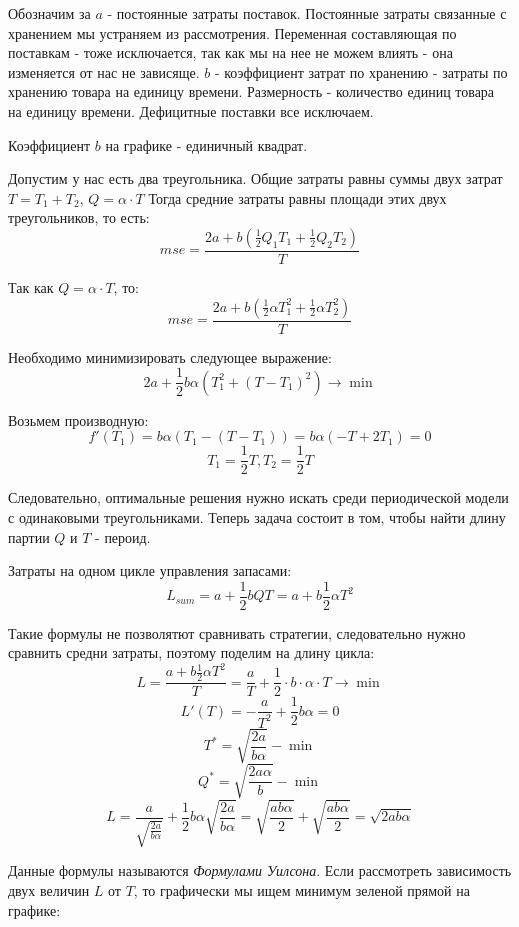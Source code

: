 \documentclass[aps,%
12pt,%
final,%
oneside,
onecolumn,%
musixtex, %
superscriptaddress,%
centertags]{article} %
\theoremstyle{plain}
\begin{document}
Обозначим за $a$ - постоянные затраты поставок. Постоянные затраты связанные с хранением мы устраняем из рассмотрения. Переменная составляющая по поставкам - тоже исключается, так как мы на нее не можем влиять - она изменяется от нас не зависяще. $b$ - коэффициент затрат по хранению - затраты по хранению товара на единицу времени. Размерность - количество единиц товара на единицу времени.
Дефицитные поставки все исключаем.

Коэффициент $b$ на графике - единичный квадрат.

Допустим у нас есть два треугольника. Общие затраты равны суммы двух затрат $T = T_1 + T_2$, $Q=\alpha \cdot T$
Тогда средние затраты равны площади этих двух треугольников, то есть:
$$mse =  \frac{2a + b(\frac{1}{2}Q_1T_1+\frac{1}{2}Q_2T_2)}{T}$$

Так как $Q=\alpha \cdot T$, то:
$$mse= \frac{2a + b(\frac{1}{2}\alpha T_1^2+\frac{1}{2} \alpha T_2^2)}{T}$$

Необходимо минимизировать следующее выражение:
$$2a + \frac{1}{2}b\alpha(T_1^2+(T-T_1)^2) \to \min$$

Возьмем производную:
$$f'(T_1) = b\alpha(T_1 - (T-T_1)) = b\alpha (-T + 2T_1)=0$$
$$T_1 = \frac{1}{2}T,T_2 = \frac{1}{2}T$$

Следовательно, оптимальные решения нужно искать среди периодической модели с одинаковыми треугольниками. Теперь задача состоит в том, чтобы найти длину партии $Q$ и $T$ - пероид.

Затраты на одном цикле управления запасами:
$$L_{sum} = a+\frac{1}{2}bQT = a+b\frac{1}{2}\alpha T^2$$

Такие формулы не позволятют сравнивать стратегии, следовательно нужно сравнить средни затраты, поэтому поделим на длину цикла:
$$ L = \frac{a+b\frac{1}{2}\alpha T^2}{T} = \frac{a}{T} + \frac{1}{2} \cdot b \cdot \alpha\cdot  T \to \min$$
$$L'(T) = -\frac{a}{T^2} + \frac{1}{2}b\alpha = 0$$
$$T^* = \sqrt{\frac{2a}{b\alpha}} - \min$$
$$Q^* = \sqrt {\frac{2a\alpha}{b}} - \min$$
$$ L = \frac{a}{\sqrt{\frac{2a}{b\alpha}}} + \frac{1}{2}b\alpha \sqrt{\frac{2a}{b\alpha}} = 
\sqrt{\frac{ab\alpha}{2}} + \sqrt{\frac{ab\alpha}{2}} = \sqrt{2ab\alpha}$$

Данные формулы называются \textit{Формулами Уилсона}.
Если рассмотреть зависимость двух величин $L$ от $T$, то графически мы ищем минимум зеленой прямой на графике:
\begin{center}
\end{center}
\end{document}
